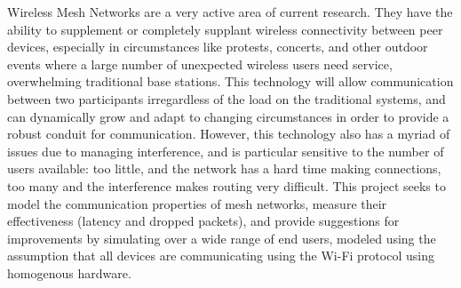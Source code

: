 Wireless Mesh Networks are a very active area of current research.
They have the ability to supplement or completely supplant wireless connectivity between peer devices,
especially in circumstances like protests, concerts, and other outdoor events where a large number of
unexpected wireless users need service, overwhelming traditional base stations.
This technology will allow communication between two participants irregardless of the load on the
traditional systems, and can dynamically grow and adapt to changing circumstances in order to provide
a robust conduit for communication.
However, this technology also has a myriad of issues due to managing interference, and is particular
sensitive to the number of users available: too little, and the network has a hard time making
connections, too many and the interference makes routing very difficult.
This project seeks to model the communication properties of mesh networks, 
measure their effectiveness (latency and dropped packets), 
and provide suggestions for improvements 
by simulating over a wide range of end users, 
modeled using the assumption that all devices are communicating using the Wi-Fi protocol
using homogenous hardware.
